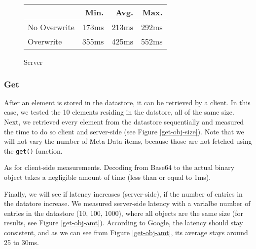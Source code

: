 \begin{figure}
\begin{tabular}{|l|r|r|r|}
\hline
 & Min. & Avg. & Max. \\
\hline
No Overwrite & 173ms & 213ms & 292ms \\
Overwrite & 355ms & 425ms & 552ms \\
\hline
\end{tabular}
\caption{Server}
\end{figure}

\subsubsection{Get}
After an element is stored in the datastore, it can be retrieved by a client.
In this case, we tested the 10 elements residing in the datstore, all of the
same size. Next, we retrieved every element from the datastore sequentially and
measured the time to do so client and server-side (see Figure
\ref{get-obj-size}). Note that we will not vary the number of Meta Data items,
because those are not fetched using the \texttt{get()} function.

As for client-side measurements. Decoding from Base64 to the actual binary
object takes a negligible amount of time (less than or equal to 1ms).

Finally, we will see if latency increases (server-side), if the number of
entries in the datatore increase. We measured server-side latency with a
varialbe number of entries in the datastore (10, 100, 1000), where all objects
are the same size (for results, see Figure \ref{get-obj-amt}). According to
Google, the latency should stay consistent, and as we can see from Figure
\ref{get-obj-amt}, its average stays around 25 to 30ms.


